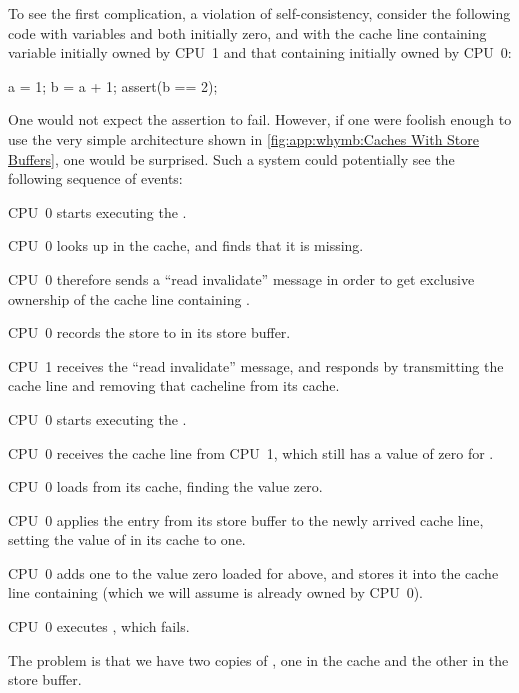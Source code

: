 To see the first complication, a violation of self-consistency,
consider the following code with variables  and  both initially
zero, and with the cache line containing variable  initially
owned by CPU~1 and that containing  initially owned by CPU~0:

\begin{VerbatimN}[fontsize=\footnotesize,samepage=true]
a = 1;
b = a + 1;
assert(b == 2);
\end{VerbatimN}

One would not expect the assertion to fail.
However, if one were foolish enough to use the very simple architecture
shown in
\cref{fig:app:whymb:Caches With Store Buffers},
one would be surprised.
Such a system could potentially see the following sequence of events:
\begin{sequence}
\item	CPU~0 starts executing the .
\item	CPU~0 looks  up in the cache, and finds that it is missing.
\item	CPU~0 therefore sends a ``read invalidate'' message in order to
	get exclusive ownership of the cache line containing .
\item	CPU~0 records the store to  in its store buffer.
\item	CPU~1 receives the ``read invalidate'' message, and responds
	by transmitting the cache line and removing that cacheline from
	its cache.
\item	CPU~0 starts executing the .
\item	CPU~0 receives the cache line from CPU~1, which still has
	a value of zero for .
\item	CPU~0 loads  from its cache, finding the value zero.
	\label{item:app:whymb:Need Store Buffer}
\item	CPU~0 applies the entry from its store buffer to the newly
	arrived cache line, setting the value of  in its cache
	to one.
\item	CPU~0 adds one to the value zero loaded for  above,
	and stores it into the cache line containing 
	(which we will assume is already owned by CPU~0).
\item	CPU~0 executes , which fails.
\end{sequence}

The problem is that we have two copies of , one in the cache and
the other in the store buffer.

